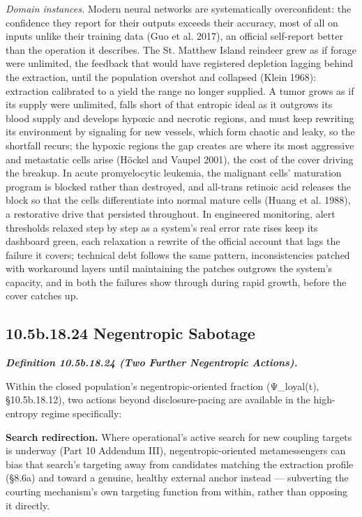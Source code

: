 \documentclass[
]{article}
\begin{document}
\emph{Domain instances.} Modern neural networks are systematically
overconfident: the confidence they report for their outputs exceeds
their accuracy, most of all on inputs unlike their training data (Guo et
al. 2017), an official self-report better than the operation it
describes. The St. Matthew Island reindeer grew as if forage were
unlimited, the feedback that would have registered depletion lagging
behind the extraction, until the population overshot and collapsed
(Klein 1968): extraction calibrated to a yield the range no longer
supplied. A tumor grows as if its supply were unlimited, falls short of
that entropic ideal as it outgrows its blood supply and develops hypoxic
and necrotic regions, and must keep rewriting its environment by
signaling for new vessels, which form chaotic and leaky, so the
shortfall recurs; the hypoxic regions the gap creates are where its most
aggressive and metastatic cells arise (Höckel and Vaupel 2001), the cost
of the cover driving the breakup. In acute promyelocytic leukemia, the
malignant cells' maturation program is blocked rather than destroyed,
and all-trans retinoic acid releases the block so that the cells
differentiate into normal mature cells (Huang et al. 1988), a
restorative drive that persisted throughout. In engineered monitoring,
alert thresholds relaxed step by step as a system's real error rate
rises keep its dashboard green, each relaxation a rewrite of the
official account that lags the failure it covers; technical debt follows
the same pattern, inconsistencies patched with workaround layers until
maintaining the patches outgrows the system's capacity, and in both the
failures show through during rapid growth, before the cover catches up.

\hypertarget{b.18.24-negentropic-sabotage}{%
\subsection{10.5b.18.24 Negentropic
Sabotage}\label{b.18.24-negentropic-sabotage}}

\emph{\textbf{Definition 10.5b.18.24 (Two Further Negentropic
Actions).}}

Within the closed population's negentropic-oriented fraction
(Ψ\_loyal(t), §10.5b.18.12), two actions beyond disclosure-pacing are
available in the high-entropy regime specifically:

\textbf{Search redirection.} Where operational's active search for new
coupling targets is underway (Part 10 Addendum III),
negentropic-oriented metamessengers can bias that search's targeting
away from candidates matching the extraction profile (§8.6a) and toward
a genuine, healthy external anchor instead --- subverting the courting
mechanism's own targeting function from within, rather than opposing it
directly.
\end{document}
